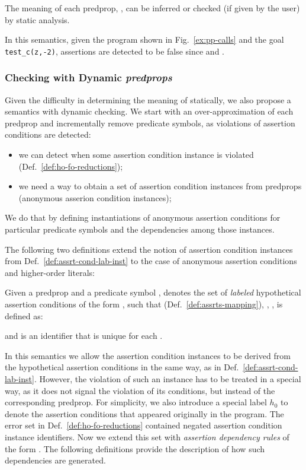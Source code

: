 \documentclass{llncs}
\newcommand{\hypId}[1]{\ensuremath{h_{#1}}}
\begin{document}
\noindent The meaning of each predprop, , can be inferred or
checked (if given by the user) by static analysis.

In this semantics, given the program shown in Fig.~\ref{ex:pp-calls}
and the goal \texttt{test\_c(z,-2)}, assertions are detected to be
false since  and 
.



\subsubsection{Checking with Dynamic \emph{predprops}}
Given the difficulty in determining the meaning of 
statically, we also propose a semantics with dynamic checking.
We start with an over-approximation of each predprop  and incrementally remove predicate symbols, as
violations of assertion conditions are detected:
\begin{itemize}
\item we can detect when some assertion condition instance is violated
  (Def.~\ref{def:ho-fo-reductions});
\item we need a way to obtain a set of assertion condition instances
  from predprops (anonymous asserion condition instances);
\end{itemize}
We do that by defining instantiations of anonymous assertion
conditions for particular predicate symbols and the dependencies among
those instances.

The following two definitions extend the notion of assertion condition
instances from Def.~\ref{def:assrt-cond-lab-inst} to the case of
anonymous assertion conditions and higher-order literals:
\begin{definition}
  \label{def:lab-hyp-assrt-cond}
  Given a predprop  and a predicate symbol ,
 denotes the set of \emph{labeled} hypothetical
  assertion conditions of the form ,
such that
 (Def.~\ref{def:assrts-mapping}),
,
,
 is defined as:
  
and  is an identifier that is unique for each .
\end{definition}

In this semantics we allow the assertion condition instances to be
derived from the hypothetical assertion conditions in the same way, as
in Def.~\ref{def:assrt-cond-lab-inst}.
However, the violation of such an instance has to be treated in a
special way, as it does not signal the violation of its conditions,
but instead of the corresponding predprop.
For simplicity, we also introduce a special label \hypId{0} to denote
the assertion conditions that appeared originally in the program.
The error set  in Def.~\ref{def:ho-fo-reductions} contained
negated assertion condition instance identifiers. Now we extend this
set with \emph{assertion dependency rules} of the form 
.
The following definitions provide the description of how such
dependencies are generated.
\end{document}
